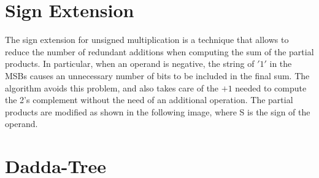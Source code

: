 \section{Sign Extension}
The sign extension for unsigned multiplication is a technique that allows to reduce the number of redundant additions when computing the sum of the partial products.
In particular, when an operand is negative, the string of $'1'$ in the MSBs causes an unnecessary number of bits to be included in the final sum. The algorithm avoids this problem,
and also takes care of the $+1$ needed to compute the 2's complement without the need of an additional operation. The partial products are modified as shown in the following image,
where S is the sign of the operand. 

\section{Dadda-Tree}




